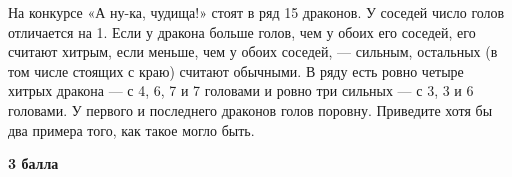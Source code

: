   На конкурсе «А ну-ка, чудища!» стоят в ряд 15 драконов. У соседей число голов отличается на 1. Если у дракона больше голов, чем у обоих его
соседей, его считают хитрым, если меньше, чем у обоих соседей, — сильным, остальных (в том
числе стоящих с краю) считают обычными. В ряду есть ровно четыре хитрых дракона — с 4,
6, 7 и 7 головами и ровно три сильных — с 3, 3 и 6 головами. У первого и последнего драконов
голов поровну. Приведите хотя бы два примера того, как такое могло быть.


\begin{flushright} \textbf{3 балла}\\ 
\end{flushright}